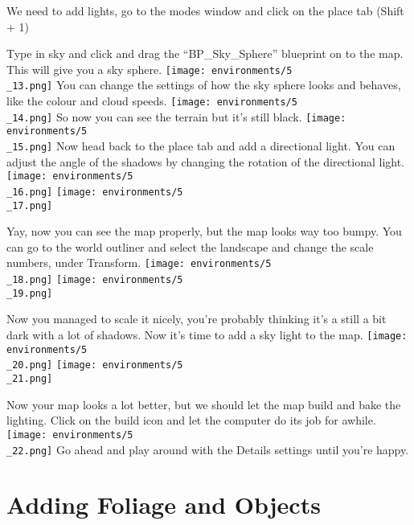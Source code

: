 \documentclass[../main.tex]{subfiles}
\begin{document}
We need to add lights, go to the modes window and click on the place tab (Shift + 1)

Type in sky and click and drag the “BP\_Sky\_Sphere” blueprint on to the map. This will give you a sky sphere.
\texttt{[image: environments/5\\\_13.png]}
You can change the settings of how the sky sphere looks and behaves, like the colour and cloud speeds.
\texttt{[image: environments/5\\\_14.png]}
So now you can see the terrain but it’s still black.
\texttt{[image: environments/5\\\_15.png]}
Now head back to the place tab and add a directional light. You can adjust the angle of the shadows by changing the rotation of the directional light.
\texttt{[image: environments/5\\\_16.png]}
\texttt{[image: environments/5\\\_17.png]}

Yay, now you can see the map properly, but the map looks way too bumpy. You can go to the world outliner and select the landscape and change the scale numbers, under Transform.
\texttt{[image: environments/5\\\_18.png]}
\texttt{[image: environments/5\\\_19.png]}

Now you managed to scale it nicely, you’re probably thinking it’s a still a bit dark with a lot of shadows. Now it’s time to add a sky light to the map.
\texttt{[image: environments/5\\\_20.png]}
\texttt{[image: environments/5\\\_21.png]}

Now your map looks a lot better, but we should let the map build and bake the lighting.
Click on the build icon and let the computer do its job for awhile.
\texttt{[image: environments/5\\\_22.png]}
Go ahead and play around with the Details settings until you’re happy.

\section{Adding Foliage and Objects}
\end{document}
